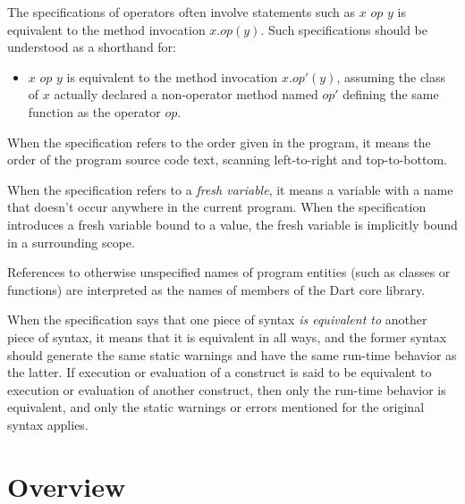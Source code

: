 \documentclass{article}
\begin{document}
\LMHash{}
The specifications of operators often involve statements such as $x$ $op$ $y$ is equivalent to the method invocation $x.op(y)$.
Such specifications should be understood as a shorthand for:
\begin{itemize}
\item
$x$ $op$ $y$ is equivalent to the method invocation $x.op'(y)$, assuming the class of $x$ actually declared a non-operator method named $op'$ defining the same function as the operator $op$.
\end{itemize}


\LMHash{}
When the specification refers to the order given in the program, it means the order of the program source code text, scanning left-to-right and top-to-bottom.

\LMHash{}
When the specification refers to a {\em fresh variable}, it means a variable with a name that doesn't occur anywhere in the current program.
When the specification introduces a fresh variable bound to a value, the fresh variable is implicitly bound in a surrounding scope.

\LMHash{}
References to otherwise unspecified names of program entities (such as classes or functions) are interpreted as the names of members of the Dart core library.


\LMHash{}
When the specification says that one piece of syntax {\em is equivalent to} another piece of syntax, it means that it is equivalent in all ways, and the former syntax should generate the same static warnings and have the same run-time behavior as the latter.
If execution or evaluation of a construct is said to be equivalent to execution or evaluation of another construct, then only the run-time behavior is equivalent, and only the static warnings or errors mentioned for the original syntax applies.


\section{Overview}
\end{document}
